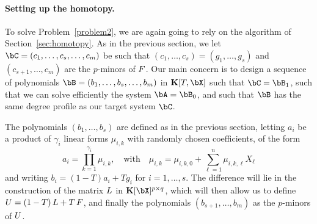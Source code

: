 \documentclass[12pt]{article}
\begin{document}



\paragraph{Setting up the homotopy.}
To solve Problem~\ref{problem2}, we are again going to rely on the
algorithm of Section~\ref{sec:homotopy}. As in the previous section,
we let $\bC=(c_1,\dots,c_s,\dots,c_m)$ be such that
$(c_1,\dots,c_s)=(g_1,\dots,g_s)$ and $(c_{s+1},\dots,c_m)$ are the
$p$-minors of ${F}$. Our main concern is to design a sequence of
polynomials $\bB=(b_1,\dots,b_s,\dots,b_m)$ in $\KK[T,\bX]$ such that
$\bC=\bB_1$, such that we can solve efficiently the system
$\bA=\bB_0$, and such that $\bB$ has the same degree profile as our target system
$\bC$.

The polynomials $(b_1,\dots,b_s)$ are defined as in the previous
section, letting $a_i$ be a product of $\gamma_i$ linear forms
$\mu_{i,k}$ with randomly chosen coefficients, of the form
$$a_i=\prod_{k=1}^{\gamma_i} \mu_{i,k},\quad\text{with}\quad
\mu_{i,k}=\mu_{i,k,0} + \sum_{\ell=1}^n \mu_{i,k,\ell}X_\ell$$ 
and writing $b_i=(1-T)a_i + T g_i$ for $i=1,\dots,s$. The
difference will lie in the construction of the matrix ${L}$ in
$\KK[\bX]^{p\times q}$, which will then allow us to define
${U}=(1-T)\,{L} + T\, {F}$, and finally the polynomials
$(b_{s+1},\dots,b_m)$ as the $p$-minors of ${U}$.
\end{document}
